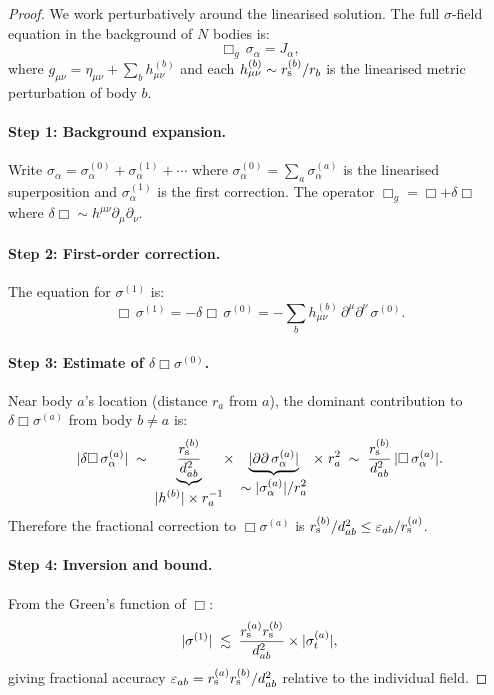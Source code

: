 \documentclass[11pt,a4paper]{article}
\theoremstyle{definition}
\theoremstyle{remark}
\newcommand{\rs}[1]{r_{\rm s}^{(#1)}}
\newcommand{\sig}[2]{\sigma_{#1}^{(#2)}}
\begin{document}
	\begin{proof}
		We work perturbatively around the linearised solution.  The full
		$\sigma$-field equation in the background of $N$ bodies is:
		\begin{equation}
			\Box_{g}\,\sigma_\alpha = J_\alpha,
		\end{equation}
		where $g_{\mu\nu}=\eta_{\mu\nu}+\sum_b h_{\mu\nu}^{(b)}$ and each
		$h_{\mu\nu}^{(b)}\sim\rs{b}/r_b$ is the linearised metric perturbation
		of body $b$.
		
		\paragraph{Step 1: Background expansion.}
		Write $\sigma_\alpha=\sigma_\alpha^{(0)}+\sigma_\alpha^{(1)}+\cdots$
		where $\sigma_\alpha^{(0)}=\sum_a\sig{\alpha}{a}$ is the linearised
		superposition and $\sigma_\alpha^{(1)}$ is the first correction.
		The operator $\Box_g=\Box+\delta\Box$ where
		$\delta\Box\sim h^{\mu\nu}\partial_\mu\partial_\nu$.
		
		\paragraph{Step 2: First-order correction.}
		The equation for $\sigma^{(1)}$ is:
		\begin{equation}
			\Box\,\sigma^{(1)} = -\delta\Box\,\sigma^{(0)}
			= -\sum_b h_{\mu\nu}^{(b)}\,\partial^\mu\partial^\nu\,\sigma^{(0)}.
			\label{eq:correction_eq}
		\end{equation}
		
		\paragraph{Step 3: Estimate of $\delta\Box\sigma^{(0)}$.}
		Near body $a$'s location (distance $r_a$ from $a$), the dominant
		contribution to $\delta\Box\sigma^{(a)}$ from body $b\neq a$ is:
		\begin{equation}
			|\delta\Box\,\sig{\alpha}{a}|
			\;\sim\;
			\underbrace{\frac{\rs{b}}{d_{ab}^2}}_{\displaystyle|h^{(b)}|\times r_a^{-1}}
			\!\times\;
			\underbrace{|\partial\partial\,\sig{\alpha}{a}|}_{\displaystyle\sim |\sig{\alpha}{a}|/r_a^2}
			\;\times\; r_a^2
			\;\sim\;
			\frac{\rs{b}}{d_{ab}^2}\,|\Box\,\sig{\alpha}{a}|.
		\end{equation}
		Therefore the fractional correction to $\Box\sigma^{(a)}$ is
		$\rs{b}/d_{ab}^2\leq\varepsilon_{ab}/\rs{a}$.
		
		\paragraph{Step 4: Inversion and bound.}
		From the Green's function of $\Box$:
		\begin{equation}
			|\sigma^{(1)}|
			\;\lesssim\;
			\frac{\rs{a}\rs{b}}{d_{ab}^2}
			\times|\sig{t}{a}|,
		\end{equation}
		giving fractional accuracy $\varepsilon_{ab}=\rs{a}\rs{b}/d_{ab}^2$
		relative to the individual field.
		

\end{proof}
\end{document}
